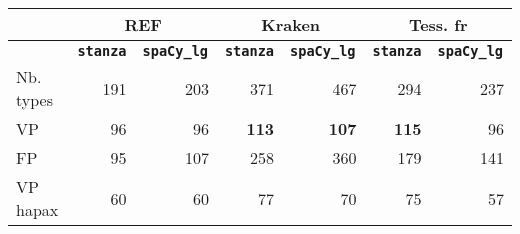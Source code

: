 
\footnotesize\begin{tabular}{|l|r|r|r|r|r|r|}
 \hline
 &\multicolumn{2}{c|}{REF}&\multicolumn{2}{c|}{Kraken} &\multicolumn{2}{c|}{Tess. fr}\\
\hline

 & \bf {\texttt{stanza}}  &\bf {\texttt{spaCy\_lg }}&\bf {\texttt{stanza}}  &\bf {\texttt{spaCy\_lg }}&\bf {\texttt{stanza}}  &\bf {\texttt{spaCy\_lg }}\\

\hline
Nb. types&191 &203 &371&467 &294&237\\
VP&96 &96 &\textbf{113}&\textbf{107}&\textbf{115}& 96\\
FP &95 &107 &258&360&179&141\\

\hline
\hline
VP hapax&60&60&77&70&75&57\\
\hline

\end{tabular}